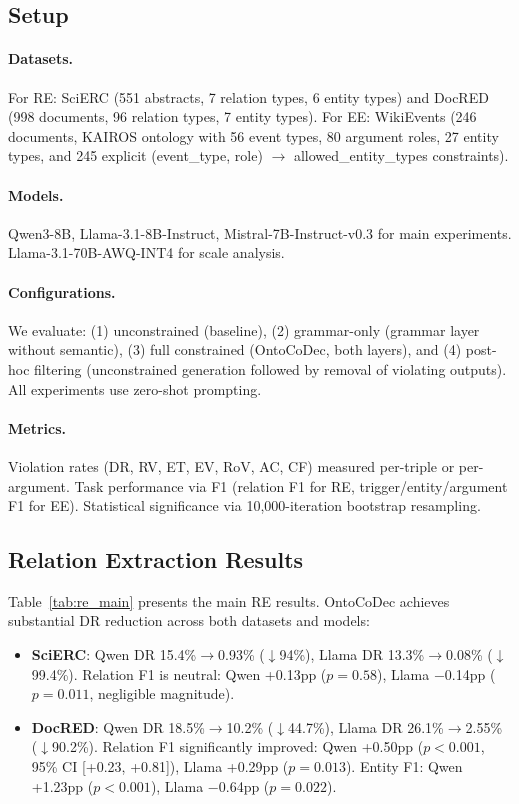 \documentclass[11pt,a4paper]{article}
\newcommand{\sys}{OntoCoDec}
\begin{document}
\subsection{Setup}
\label{sec:setup}

\paragraph{Datasets.}
For RE: SciERC (551 abstracts, 7 relation types, 6 entity types) and DocRED (998 documents, 96 relation types, 7 entity types). For EE: WikiEvents (246 documents, KAIROS ontology with 56 event types, 80 argument roles, 27 entity types, and 245 explicit (event\_type, role) $\to$ allowed\_entity\_types constraints).

\paragraph{Models.}
Qwen3-8B, Llama-3.1-8B-Instruct, Mistral-7B-Instruct-v0.3 for main experiments. Llama-3.1-70B-AWQ-INT4 for scale analysis.

\paragraph{Configurations.}
We evaluate: (1) unconstrained (baseline), (2) grammar-only (grammar layer without semantic), (3) full constrained (\sys{}, both layers), and (4) post-hoc filtering (unconstrained generation followed by removal of violating outputs). All experiments use zero-shot prompting.

\paragraph{Metrics.}
Violation rates (DR, RV, ET, EV, RoV, AC, CF) measured per-triple or per-argument. Task performance via F1 (relation F1 for RE, trigger/entity/argument F1 for EE). Statistical significance via 10,000-iteration bootstrap resampling.

\subsection{Relation Extraction Results}
\label{sec:re_results}

Table~\ref{tab:re_main} presents the main RE results. \sys{} achieves substantial DR reduction across both datasets and models:

\begin{itemize}[nosep]
\item \textbf{SciERC}: Qwen DR 15.4\%$\to$0.93\% ($\downarrow$94\%), Llama DR 13.3\%$\to$0.08\% ($\downarrow$99.4\%). Relation F1 is neutral: Qwen +0.13pp ($p=0.58$), Llama $-$0.14pp ($p=0.011$, negligible magnitude).
\item \textbf{DocRED}: Qwen DR 18.5\%$\to$10.2\% ($\downarrow$44.7\%), Llama DR 26.1\%$\to$2.55\% ($\downarrow$90.2\%). Relation F1 significantly improved: Qwen +0.50pp ($p<0.001$, 95\% CI [+0.23, +0.81]), Llama +0.29pp ($p=0.013$). Entity F1: Qwen +1.23pp ($p<0.001$), Llama $-$0.64pp ($p=0.022$).
\end{itemize}
\end{document}
